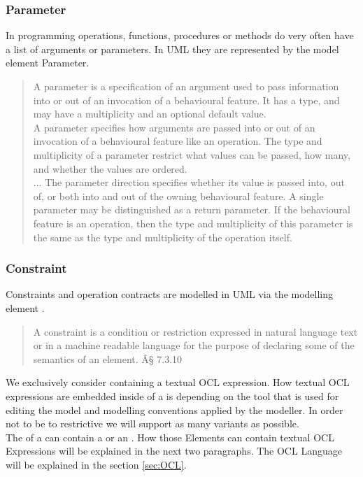 \subsubsection{Parameter} 
In programming operations, functions, procedures or methods do very often have a list of arguments or parameters. In UML they are represented by the model element Parameter.
\begin{quotation}
A parameter is a specification of an argument used to pass information into or out of an invocation of a behavioural feature. It has a type, and may have a multiplicity and an optional default value.\\
A parameter specifies how arguments are passed into or out of an invocation of a behavioural feature like an operation. The
type and multiplicity of a parameter restrict what values can be passed, how many, and whether the values are ordered.\\
...
The parameter direction specifies whether its value is passed into, out of, or both into and out of the owning behavioural
feature. A single parameter may be distinguished as a return parameter. If the behavioural feature is an operation, then the
type and multiplicity of this parameter is the same as the type and multiplicity of the operation itself.
\cite{UML23Superstructure}
\end{quotation}
\subsubsection{Constraint}
\label{sec:Constraint}
Constraints and operation contracts are modelled in UML via the modelling element .
\begin{quotation}
A constraint is a condition or restriction expressed in natural language text or in a machine readable language for the
purpose of declaring some of the semantics of an element.\cite{UML23Superstructure} Â§ 7.3.10
\end{quotation}
We exclusively consider  containing a textual OCL expression. How textual OCL expressions are embedded inside of a  is depending on the tool that is used for editing the model and modelling conventions applied by the modeller. In order not to be to restrictive we will support as many variants as possible.\\ 
The  of a  can contain a  or an . How those Elements can contain textual OCL Expressions will be explained in the next two paragraphs. The OCL Language will be explained in the section \ref{sec:OCL}.
